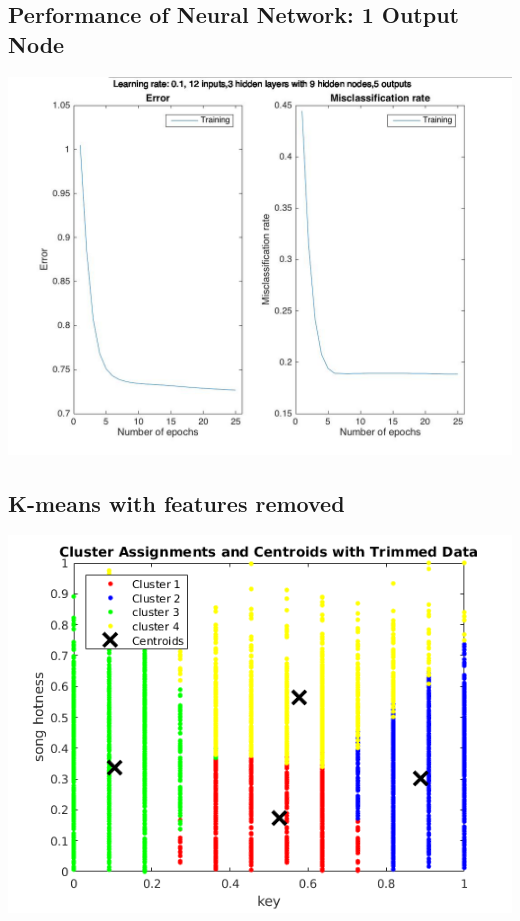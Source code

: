 \documentclass[12pt]{article}
\begin{document}
\subsection{Performance of Neural Network: 1 Output Node}
\label{subsec:annBestPerformance}
\includegraphics[scale=0.3]{images/ann/bestRun}


\subsection{K-means with features removed}
\label{subsec:trimmedKmeans}
\includegraphics[width=\textwidth]{images/clustering/trimmedkMeans}
\end{document}
